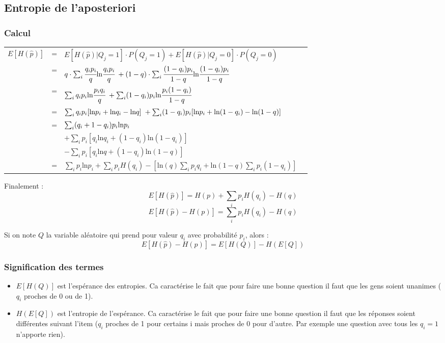 \documentclass[12pt]{article}
\begin{document}
\subsection{Entropie de l'aposteriori}
\subsubsection{Calcul}
\begin{tabular}{ r c l  p{10cm}}
$E[H(\hat{p})]$ & = & $E[H(\hat{p}) | Q_j = 1]\cdot P(Q_j = 1) + E[H(\hat{p}) | Q_j = 0]\cdot P(Q_j = 0)$\\
& = & $q \cdot \sum_i \cfrac{q_ip_i}{q}\text{ln}\cfrac{q_ip_i}{q} \hspace{1mm}+(1-q) \cdot \sum_i \cfrac{(1-q_i)p_i}{1-q}\text{ln}\cfrac{(1-q_i)p_i}{1-q}$\\
& = & $\sum_i q_ip_i\text{ln}\cfrac{p_iq_i}{q} \hspace{1mm}+\sum_i (1-q_i)p_i\text{ln}\cfrac{p_i(1-q_i)}{1-q}$\\
& = & $\sum_i q_ip_i[\text{ln}p_i+\text{ln}q_i-\text{ln}q] \hspace{1mm}+\sum_i (1-q_i)p_i[\text{ln}p_i+\text{ln}(1-q_i)-\text{ln}(1-q)]$\\
& = & $\sum_i (q_i + 1 - q_i)p_i\text{ln}p_i \hspace{1mm}$\\
&&$+ \sum_i p_i[q_i\text{ln}q_i + (1-q_i)\text{ln}(1-q_i)]$\\
&&$- \sum_i p_i[q_i\text{ln}q + (1-q_i)\text{ln}(1-q)]$\\
& = &$\sum_i p_i\text{ln}p_i +\sum_i p_iH(q_i) - [\text{ln}(q)\sum_ip_iq_i + \text{ln}(1-q)\sum_ip_i(1-q_i)]$\\
\end{tabular}

Finalement : \[E[H(\hat{p})] = H(p) + \sum_i p_iH(q_i) - H(q)\]
\[E[H(\hat{p})- H(p)] = \sum_i p_iH(q_i) - H(q)\]

Si on note $Q$ la variable aléatoire qui prend pour valeur $q_i$ avec probabilité $p_i$, alors : 
\[E[H(\hat{p})- H(p)] = E[H(Q)] - H(E[Q])\]

\subsubsection{Signification des termes}
\begin{itemize}
	\item $E[H(Q)]$ est l'espérance des entropies. Ca caractérise le fait que pour faire une bonne question il faut que les gens soient unanimes ($q_i$ proches de 0 ou de 1). 
	\item $H(E[Q])$ est l'entropie de l'espérance. Ca caractérise le fait que pour faire une bonne question il faut que les réponses soient différentes suivant l'item ($q_i$ proches de 1 pour certains i mais proches de 0 pour d'autre. Par exemple une question avec tous les $q_i = 1$ n'apporte rien). 
\end{itemize}
\end{document}
